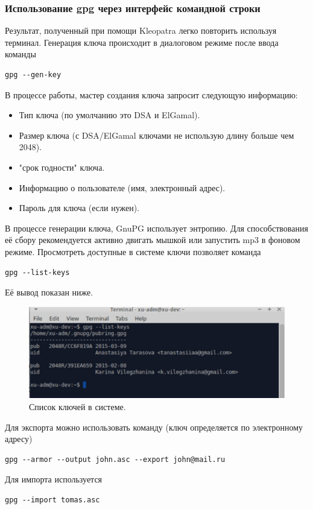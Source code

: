 \documentclass[12pt,a4paper]{article}
\begin{document}
\subsubsection{Использование gpg через интерфейс командной строки}

Результат, полученный при помощи Kleopatra легко повторить используя терминал. Генерация ключа происходит в диалоговом режиме после ввода команды
\begin{verbatim}gpg --gen-key
\end{verbatim}
В процессе работы, мастер создания ключа запросит следующую информацию:
\begin{itemize}
\item{Тип ключа (по умолчанию это DSA и ElGamal).}
\item{Размер ключа (с DSA/ElGamal ключами не использую длину больше чем 2048).}
\item{"срок годности" ключа.}
\item{Информацию о пользователе (имя, электронный адрес).}
\item{Пароль для ключа (если нужен).}
\end{itemize}
В процессе генерации ключа, GnuPG использует энтропию. Для способствования её сбору рекомендуется активно двигать мышкой или запустить mp3 в фоновом режиме.
Просмотреть доступные в системе ключи позволяет команда
\begin{verbatim}gpg --list-keys
\end{verbatim}
Её вывод показан ниже.
\begin{figure}[h!]
\centering
\includegraphics[scale=0.8]{res/gpgterminal}
\caption{Список ключей в системе.}
\end{figure}
Для экспорта можно использовать команду (ключ определяется по электронному адресу)
\begin{verbatim}gpg --armor --output john.asc --export john@mail.ru
\end{verbatim}
Для импорта используется
\begin{verbatim}gpg --import tomas.asc
\end{verbatim}
\end{document}
